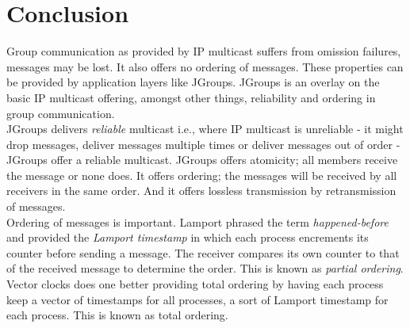 \section{Conclusion}
\label{jgroup_conclusion}
Group communication as provided by IP multicast suffers from omission failures, messages may be lost. It also offers no ordering of messages. These properties can be provided by application layers like JGroups. JGroups is an overlay on the basic IP multicast offering, amongst other things, reliability and ordering in group communication. \\

JGroups delivers \emph{reliable} multicast i.e., where IP multicast is unreliable - it might drop messages, deliver messages multiple times or deliver messages out of order - JGroups offer a reliable multicast. JGroups offers atomicity; all members receive the message or none does. It offers ordering; the messages will be received by all receivers in the same order. And it offers lossless transmission by retransmission of messages.\\

Ordering of messages is important. Lamport phrased the term \emph{happened-before} and provided the \emph{Lamport timestamp} in which each process encrements its counter before sending a message. The receiver compares its own counter to that of the received message to determine the order. This is known as \emph{partial ordering}.\\

Vector clocks does one better providing total ordering by having each process keep a vector of timestamps for all processes, a sort of Lamport timestamp for each process. This is known as total ordering. \\



